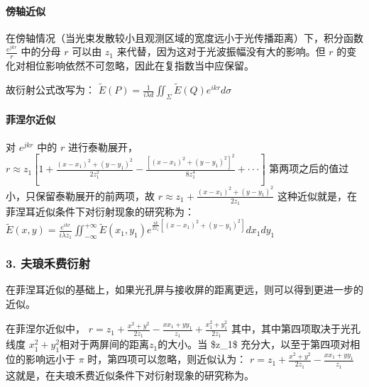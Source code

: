 \documentclass[a4paper,10pt,english]{sphinxmanual}
\begin{document}
\paragraph{傍轴近似}
\label{\detokenize{_u7b80_u4ecb/_u6838_u5fc3_u8bbe_u8ba1_u4f18_u5316_u7b97_u6cd5/_u8fdc_u573a_u4f20_u64ad_u6a21_u5757/contents:id4}}
\sphinxAtStartPar


\sphinxAtStartPar
{}





\sphinxAtStartPar
在傍轴情况（当光束发散较小且观测区域的宽度远小于光传播距离）下，积分函数 \(\frac{e^{jkr}}{r}\) 中的分母 \(r\) 可以由 \(z_1\) 来代替，因为这对于光波振幅没有大的影响。但 \(r\)  的变化对相位影响依然不可忽略，因此在复指数当中应保留。

\sphinxAtStartPar
故衍射公式改写为：
\(\tilde{E}(P)=\frac{1}{i\lambda d}\iint_{\Sigma}{\tilde{E}(Q)e^{ikr}d\sigma}\)


\paragraph{菲涅尔近似}
\label{\detokenize{_u7b80_u4ecb/_u6838_u5fc3_u8bbe_u8ba1_u4f18_u5316_u7b97_u6cd5/_u8fdc_u573a_u4f20_u64ad_u6a21_u5757/contents:id5}}
\sphinxAtStartPar
对 \(e^{jkr}\) 中的 \(r\) 进行泰勒展开，
\(r\approx z_1[1+\frac{(x-x_1)^2+(y-y_1)^2}{2z_1^2}-\frac{[(x-x_1)^2+(y-y_1)^2]^2}{8z_1^4}+\cdot\cdot\cdot]\)
第两项之后的值过小，只保留泰勒展开的前两项，故
\(r\approx z_1+\frac{(x-x_1)^2+(y-y_1)^2}{2z_1}\)
这种近似就是，在菲涅耳近似条件下对衍射现象的研究称为：
\(\tilde{E}(x,y)=\frac{e^{ikr}}{i\lambda z_1}\iint_{-\infty}^{+\infty}{\tilde{E}(x_1,y_1)e^{\frac{ik}{2z_1}[(x-x_1)^2+(y-y_1)^2]}dx_1dy_1}\)


\subsubsection{3. 夫琅禾费衍射}
\label{\detokenize{_u7b80_u4ecb/_u6838_u5fc3_u8bbe_u8ba1_u4f18_u5316_u7b97_u6cd5/_u8fdc_u573a_u4f20_u64ad_u6a21_u5757/contents:id6}}
\sphinxAtStartPar
在菲涅耳近似的基础上，如果光孔屏与接收屏的距离更远，则可以得到更进一步的近似。

\sphinxAtStartPar
在菲涅尔近似中，
\(r= z_1+\frac{x^2+y^2}{2z_1}-\frac{xx_1+yy_1}{z_1}+\frac{x_1^2+y_1^2}{2z_1}\)
其中，其中第四项取决于光孔线度 \(x_1^2+y_1^2\)相对于两屏间的距离\(z_1\)的大小。当 \$z\_1\$ 充分大，以至于第四项对相位的影响远小于 \(\pi\) 时，第四项可以忽略，则近似认为：
\(r= z_1+\frac{x^2+y^2}{2z_1}-\frac{xx_1+yy_1}{z_1}\)
这就是，在夫琅禾费近似条件下对衍射现象的研究称为。
\end{document}
